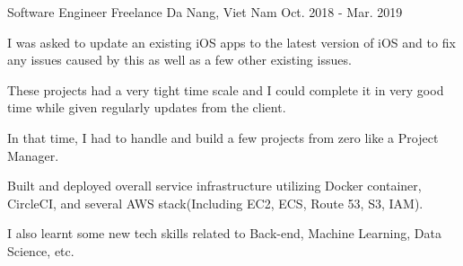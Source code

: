 \begin{cventries}
  \cventry
    {Software Engineer} %
    {Freelance} %
    {Da Nang, Viet Nam} %
    {Oct. 2018 - Mar. 2019} %
    {
      \begin{cvitems} %
        \item {I was asked to update an existing iOS apps to the latest version of iOS and to fix any issues caused by this as well as a few other existing issues.}
        \item {These projects had a very tight time scale and I could complete it in very good time while given regularly updates from the client.}
        \item {In that time, I had to handle and build a few projects from zero like a Project Manager.}
        \item {Built and deployed overall service infrastructure utilizing Docker container, CircleCI, and several AWS stack(Including EC2, ECS, Route 53, S3, IAM).}
        \item {I also learnt some new tech skills related to Back-end, Machine Learning, Data Science, etc.}
      \end{cvitems}
    }


\end{cventries}
